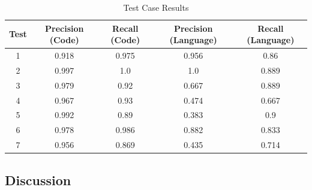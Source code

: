 \documentclass[12pt]{scrreprt}
\begin{document}
\begin{table}[h]
    \centering
    \begin{tabular}{|c|c|c|c|c|}
        \hline
        \textbf{Test} & \textbf{Precision (Code)} & \textbf{Recall (Code)} & \textbf{Precision (Language)} & \textbf{Recall (Language)} \\
        \hline
        1 & 0.918 & 0.975 & 0.956 & 0.86 \\
        \hline
        2 & 0.997 & 1.0 & 1.0 & 0.889 \\
        \hline
        3 & 0.979 & 0.92 & 0.667 & 0.889 \\
        \hline
        4 & 0.967 & 0.93 & 0.474 & 0.667 \\
        \hline
        5 & 0.992 & 0.89 & 0.383 & 0.9 \\
        \hline
        6 & 0.978 & 0.986 & 0.882 & 0.833 \\
        \hline
        7 & 0.956 & 0.869 & 0.435 & 0.714 \\
        \hline
    \end{tabular}
    \caption{Test Case Results}
    \label{tab:results}
\end{table}

\subsection{Discussion}
\end{document}

